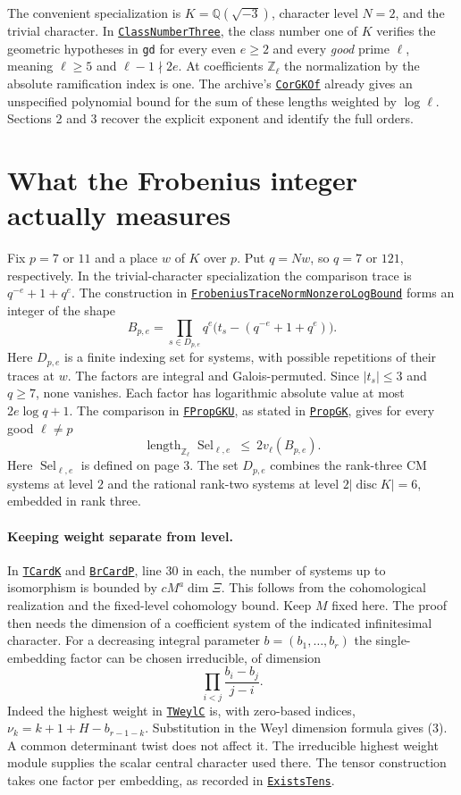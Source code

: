\documentclass[11pt]{article}
\newcommand{\Z}{\mathbb Z}
\newcommand{\Q}{\mathbb Q}
\newcommand{\len}{\operatorname{length}}
\newcommand{\Sel}{\operatorname{Sel}}
\newcommand{\avref}[2]{\href{run:lean/src/Development/AutomorphicArithmetic/AutomorphicVarieties/#1.lean}{\texttt{#2}}}
\newcommand{\denseref}[2]{\avref{ModularityArgument/ThresholdArguments/DenseThresholdCases/#1}{#2}}
\begin{document}
The convenient specialization is $K=\Q(\sqrt{-3})$, character level $N=2$,
and the trivial character. In
\avref{SmallClassNumbers/ClassNumberThree}{ClassNumberThree},
the class number one of $K$ verifies the geometric hypotheses in
\texttt{gd} for every even $e\ge2$ and every \emph{good} prime $\ell$, meaning
$\ell\ge5$ and $\ell-1\nmid 2e$. At coefficients $\Z_\ell$ the normalization
by the absolute ramification index is one. The archive's
\avref{SmallClassNumbers/CorGKOf}{CorGKOf} already gives an unspecified
polynomial bound for the sum of these lengths weighted by $\log\ell$.
Sections 2 and 3 recover the explicit exponent and identify the full orders.

\newpage
\section{What the Frobenius integer actually measures}
Fix $p=7$ or $11$ and a place $w$ of $K$ over $p$. Put $q=Nw$, so $q=7$ or
$121$, respectively. In the trivial-character specialization the comparison
trace is $q^{-e}+1+q^e$. The construction in
\avref{BuildingsResidueChars/FrobeniusTraceNormNonzeroLogBound}{FrobeniusTraceNormNonzeroLogBound}
forms an integer of the shape
\[
 B_{p,e}=\prod_{s\in D_{p,e}}
 q^e\bigl(t_s-(q^{-e}+1+q^e)\bigr).
 \tag{1}
\]
Here $D_{p,e}$ is a finite indexing set for systems, with possible repetitions
of their traces at $w$. The factors are integral and Galois-permuted. Since
$|t_s|\le3$ and $q\ge7$, none vanishes. Each factor has logarithmic
absolute value at most $2e\log q+1$. The comparison in
\denseref{FPropGKU}{FPropGKU}, as stated in
\avref{UnitaryThreeGroups/KatoUse}{PropGK}, gives for every good $\ell\ne p$
\[
 \len_{\Z_\ell}\Sel_{\ell,e}\ \le\ 2v_\ell(B_{p,e}).
 \tag{2}
\]
Here $\Sel_{\ell,e}$ is defined on page 3. The set $D_{p,e}$ combines the
rank-three CM systems at level $2$ and the rational rank-two systems at
level $2|\operatorname{disc}K|=6$, embedded in rank three.

\paragraph{Keeping weight separate from level.}
In \denseref{TCardK}{TCardK} and \denseref{BrCardP}{BrCardP}, line 30 in
each, the number of systems up to isomorphism is bounded by
$c M^a\dim\Xi$. This follows from the cohomological realization and the
fixed-level cohomology bound. Keep $M$ fixed here. The proof then needs the
dimension of a coefficient system of the indicated infinitesimal character.
For a decreasing integral parameter $b=(b_1,\dots,b_r)$ the single-embedding
factor can be chosen irreducible, of dimension
\[
             \prod_{i<j}\frac{b_i-b_j}{j-i}.
 \tag{3}
\]
Indeed the highest weight in \denseref{TWeylC}{TWeylC} is, with zero-based
indices, $\nu_k=k+1+H-b_{r-1-k}$. Substitution in the Weyl dimension
formula gives (3). A common determinant twist does not affect it. The
irreducible highest weight module supplies the scalar central character used
there. The tensor construction takes one factor per embedding, as recorded in
\avref{GaloisLibrary/WeylCharacterRegularity/ExistsTens}{ExistsTens}.
\end{document}

